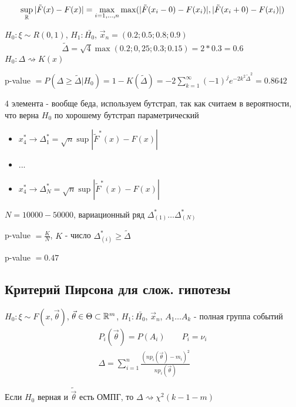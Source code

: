 \documentclass{article}
\begin{document}
\[
  \sup \limits_{\mathbb{R}}|\tilde{F}(x)-F(x)|=
  \max \limits_{i=1,\dots ,n} \max(|\tilde{F}(x_i-0)-F(x_i)|,|\tilde{F}(x_i+0)-F(x_i)| )
\]
\begin{eg}
  $H_0:\xi \sim R(0,1)$, $H_1:\bar{H_0}$, $\vec{x}_n=(0.2; 0.5; 0.8; 0.9)$
  \begin{gather*}
    \tilde{\Delta} = \sqrt{4} \max (0.2;0,25; 0.3; 0.15)=2*0.3=0.6
  \end{gather*}
  $H_0: \Delta \rightsquigarrow K(x)$

  p-value $=P(\Delta \ge \tilde{\Delta} | H_0)=1-K(\tilde{\Delta})=-2\sum_{k=1}^{\infty}(-1)^{j}e^{-2k^{2}\tilde{\Delta}^{2}}=0.8642$

  4 элемента - вообще беда, используем бутстрап, так как считаем в вероятности,
  что верна $H_0$ по хорошему бутстрап параметрический
  \begin{itemize}
    \item $x_4^{*} \rightarrow \Delta_1^{*}=\sqrt{n}\sup|\tilde{F}^{*}(x)-F(x)|$
    \item ...
    \item $x_4^{*} \rightarrow \Delta_{N}^{*}=\sqrt{n}\sup|\tilde{F}^{*}(x)-F(x)|$
  \end{itemize}
  $N=10 0 0 0-50 0 0 0$, вариационный ряд $\Delta_{(1)}^{*}\dots \Delta_{(N)}^{*}$

  p-value $=\frac{K}{N}$, $K$ - число $\Delta^{*}_{(i)} \ge \tilde{\Delta}$

  p-value $=0.47$
\end{eg}

\subsection{Критерий Пирсона для слож. гипотезы}
$H_0: \xi \sim F(x, \vec{\theta})$, $\vec{\theta} \in \Theta \subset \mathbb{R}^{m}$,
$H_1:\bar{H_0}$, $\vec{x}_n$, $A_1\dots A_k$ - полная группа событий
\begin{gather*}
  P_i(\vec{\theta})=P(A_i) \qquad P_i=\nu_i \\ 
  \Delta=\sum_{i=1}^{n}\frac{(np_i(\vec{\theta})-m_i)^{2}}{np_i(\vec{\theta})}
\end{gather*}
\begin{theorem}
  Если $H_0$ верная и $\tilde{\vec{\theta}}$ есть ОМПГ,
  то $\Delta \rightsquigarrow  \chi^{2}(k-1-m)$
\end{theorem}
\end{document}
